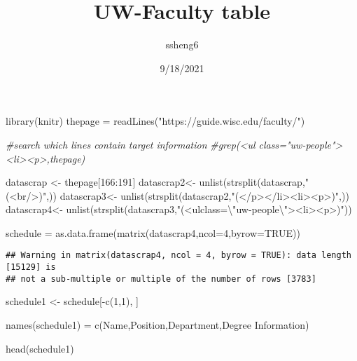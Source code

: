\documentclass[
]{article}
\title{UW-Faculty table}
\author{ssheng6}
\date{9/18/2021}
\newenvironment{Shaded}{\begin{snugshade}}{\end{snugshade}}
\newcommand{\AttributeTok}[1]{\textcolor[rgb]{0.77,0.63,0.00}{#1}}
\newcommand{\CommentTok}[1]{\textcolor[rgb]{0.56,0.35,0.01}{\textit{#1}}}
\newcommand{\ConstantTok}[1]{\textcolor[rgb]{0.00,0.00,0.00}{#1}}
\newcommand{\DecValTok}[1]{\textcolor[rgb]{0.00,0.00,0.81}{#1}}
\newcommand{\FunctionTok}[1]{\textcolor[rgb]{0.00,0.00,0.00}{#1}}
\newcommand{\NormalTok}[1]{#1}
\newcommand{\OtherTok}[1]{\textcolor[rgb]{0.56,0.35,0.01}{#1}}
\newcommand{\SpecialCharTok}[1]{\textcolor[rgb]{0.00,0.00,0.00}{#1}}
\newcommand{\StringTok}[1]{\textcolor[rgb]{0.31,0.60,0.02}{#1}}
\begin{document}
\maketitle

\begin{Shaded}
\begin{Highlighting}[]
\FunctionTok{library}\NormalTok{(knitr)}
\NormalTok{thepage }\OtherTok{=} \FunctionTok{readLines}\NormalTok{(}\StringTok{"https://guide.wisc.edu/faculty/"}\NormalTok{)}

\CommentTok{\#search which lines contain target information}
\CommentTok{\#grep(\textquotesingle{}\textless{}ul class="uw{-}people"\textgreater{}\textless{}li\textgreater{}\textless{}p\textgreater{}\textquotesingle{},thepage)}


\NormalTok{datascrap }\OtherTok{\textless{}{-}}\NormalTok{ thepage[}\DecValTok{166}\SpecialCharTok{:}\DecValTok{191}\NormalTok{]}
\NormalTok{datascrap2}\OtherTok{\textless{}{-}} \FunctionTok{unlist}\NormalTok{(}\FunctionTok{strsplit}\NormalTok{(datascrap,}\StringTok{"(\textless{}br/\textgreater{})"}\NormalTok{,))}
\NormalTok{datascrap3}\OtherTok{\textless{}{-}} \FunctionTok{unlist}\NormalTok{(}\FunctionTok{strsplit}\NormalTok{(datascrap2,}\StringTok{"(\textless{}/p\textgreater{}\textless{}/li\textgreater{}\textless{}li\textgreater{}\textless{}p\textgreater{})"}\NormalTok{,))}
\NormalTok{datascrap4}\OtherTok{\textless{}{-}} \FunctionTok{unlist}\NormalTok{(}\FunctionTok{strsplit}\NormalTok{(datascrap3,}\StringTok{"(\textless{}ulclass=}\SpecialCharTok{\textbackslash{}"}\StringTok{uw{-}people}\SpecialCharTok{\textbackslash{}"}\StringTok{\textgreater{}\textless{}li\textgreater{}\textless{}p\textgreater{})"}\NormalTok{))}

\NormalTok{schedule }\OtherTok{=} \FunctionTok{as.data.frame}\NormalTok{(}\FunctionTok{matrix}\NormalTok{(datascrap4,}\AttributeTok{ncol=}\DecValTok{4}\NormalTok{,}\AttributeTok{byrow=}\ConstantTok{TRUE}\NormalTok{))}
\end{Highlighting}
\end{Shaded}

\begin{verbatim}
## Warning in matrix(datascrap4, ncol = 4, byrow = TRUE): data length [15129] is
## not a sub-multiple or multiple of the number of rows [3783]
\end{verbatim}

\begin{Shaded}
\begin{Highlighting}[]
\NormalTok{schedule1 }\OtherTok{\textless{}{-}}\NormalTok{ schedule[}\SpecialCharTok{{-}}\FunctionTok{c}\NormalTok{(}\DecValTok{1}\NormalTok{,}\DecValTok{1}\NormalTok{), ]}

\FunctionTok{names}\NormalTok{(schedule1) }\OtherTok{=} \FunctionTok{c}\NormalTok{(}\StringTok{\textquotesingle{}Name\textquotesingle{}}\NormalTok{,}\StringTok{\textquotesingle{}Position\textquotesingle{}}\NormalTok{,}\StringTok{\textquotesingle{}Department\textquotesingle{}}\NormalTok{,}\StringTok{\textquotesingle{}Degree Information\textquotesingle{}}\NormalTok{) }

\FunctionTok{head}\NormalTok{(schedule1) }
\end{Highlighting}
\end{Shaded}
\end{document}
